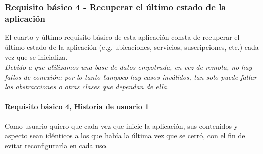 \documentclass[../ei103948-project-documentation.tex]{subfiles}
\begin{document}
						\testBasicoX

						\newpage


			\subsubsection{Requisito básico 4 - Recuperar el último estado de la aplicación}
			El cuarto y último requisito básico de esta aplicación consta de recuperar el último estado de la aplicación (e.g. ubicaciones, servicios, suscripciones, etc.) cada vez que se inicializa.\\

			\emph{Debido a que utilizamos una base de datos empotrada, en vez de remota, no hay fallos de conexión; por lo tanto tampoco hay casos inválidos, tan solo puede fallar las abstracciones o otras clases que dependan de ella.}

				\paragraph{Requisito básico 4, Historia de usuario 1}
				Como usuario quiero que cada vez que inicie la aplicación, sus contenidos y aspecto sean idénticos a los que había la última vez que se cerró, con el fin de evitar reconfigurarla en cada uso.
\end{document}
